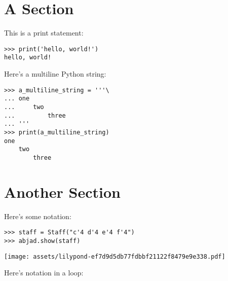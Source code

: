 \documentclass{article}
\begin{document}
\section{A Section}

This is a print statement:

\begin{comment}
<abjad>
print('hello, world!')
</abjad>
\end{comment}

\begin{lstlisting}
>>> print('hello, world!')
hello, world!
\end{lstlisting}

Here's a multiline Python string:

\begin{comment}
<abjad>
a_multiline_string = '''\
one
    two
        three
'''
print(a_multiline_string)
</abjad>
\end{comment}

\begin{lstlisting}
>>> a_multiline_string = '''\
... one
...     two
...         three
... '''
>>> print(a_multiline_string)
one
    two
        three
\end{lstlisting}

\section{Another Section}

Here's some notation:

\begin{comment}
<abjad>
staff = Staff("c'4 d'4 e'4 f'4")
abjad.show(staff)
</abjad>
\end{comment}

\begin{lstlisting}
>>> staff = Staff("c'4 d'4 e'4 f'4")
>>> abjad.show(staff)
\end{lstlisting}
\noindent\texttt{[image: assets/lilypond-ef7d9d5db77fdbbf21122f8479e9e338.pdf]}

Here's notation in a loop:

\begin{comment}
<abjad>
for leaf in iterate(staff).leaves():
    duration = inspect(leaf).get_duration()
    print(duration)
    abjad.show(leaf)

</abjad>
\end{comment}
\end{document}

